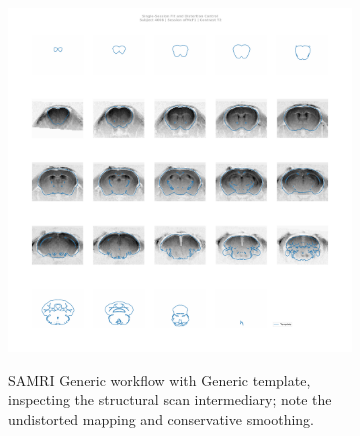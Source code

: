 \begin{figure}[h!]
\begin{subfigure}[t]{0.48\textwidth}
{			\includegraphics[width=\textwidth]{data/manual_overview/generic/4008_ofMcF1_T2w} 
			}
		\caption{
			SAMRI Generic workflow with Generic template, inspecting the structural scan intermediary; note the undistorted mapping and conservative smoothing.
			\vspace{1em}
			}
		\label{fig:fit_gga}
	\end{subfigure}
	\begin{subfigure}[t]{0.48\textwidth}
		\centering
		\setlength{\fboxsep}{0pt}%
		\setlength{\fboxrule}{0.2pt}%
\end{subfigure}
\end{figure}
